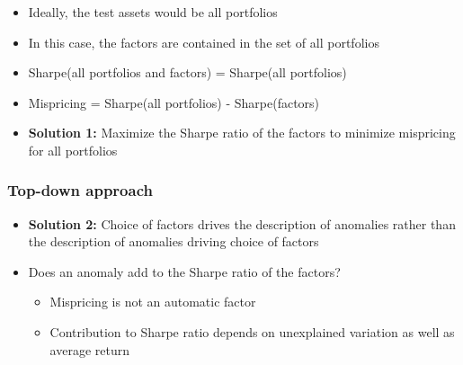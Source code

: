 \documentclass[notes]{beamer}  %
\begin{document}

\begin{frame} \frametitle{\textcite{barillas2016alpha}}
  \begin{itemize}
    \item Ideally, the test assets would be all portfolios
    \item In this case, the factors are contained in the set of all portfolios
    \item Sharpe(all portfolios and factors) = Sharpe(all portfolios)
    \item Mispricing = Sharpe(all portfolios) - Sharpe(factors)
    \item \textbf{Solution 1:} Maximize the Sharpe ratio of the factors to
    minimize mispricing for all portfolios
  \end{itemize}
\end{frame}


\begin{frame} \frametitle{Top-down approach}
  \begin{itemize}
    \item \textbf{Solution 2:} Choice of factors drives the description
    of anomalies rather than the description of anomalies driving choice
    of factors
    \item Does an anomaly add to the Sharpe ratio of the factors?
    \begin{itemize}
      \item Mispricing is not an automatic factor
      \item Contribution to Sharpe ratio depends on unexplained variation
      as well as average return
    \end{itemize}
  \end{itemize}
\end{frame}
\end{document}
